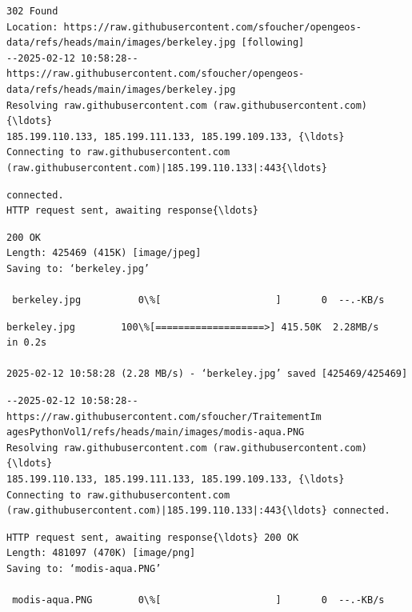 \documentclass[11pt]{article}
\begin{document}
    \begin{Verbatim}[commandchars=\\\{\}]
302 Found
Location: https://raw.githubusercontent.com/sfoucher/opengeos-
data/refs/heads/main/images/berkeley.jpg [following]
--2025-02-12 10:58:28--  https://raw.githubusercontent.com/sfoucher/opengeos-
data/refs/heads/main/images/berkeley.jpg
Resolving raw.githubusercontent.com (raw.githubusercontent.com){\ldots}
185.199.110.133, 185.199.111.133, 185.199.109.133, {\ldots}
Connecting to raw.githubusercontent.com
(raw.githubusercontent.com)|185.199.110.133|:443{\ldots}
    \end{Verbatim}

    \begin{Verbatim}[commandchars=\\\{\}]
connected.
HTTP request sent, awaiting response{\ldots}
    \end{Verbatim}

    \begin{Verbatim}[commandchars=\\\{\}]
200 OK
Length: 425469 (415K) [image/jpeg]
Saving to: ‘berkeley.jpg’

 berkeley.jpg          0\%[                    ]       0  --.-KB/s
    \end{Verbatim}

    \begin{Verbatim}[commandchars=\\\{\}]
 berkeley.jpg        100\%[===================>] 415.50K  2.28MB/s    in 0.2s

2025-02-12 10:58:28 (2.28 MB/s) - ‘berkeley.jpg’ saved [425469/425469]

    \end{Verbatim}

    \begin{Verbatim}[commandchars=\\\{\}]
--2025-02-12 10:58:28--  https://raw.githubusercontent.com/sfoucher/TraitementIm
agesPythonVol1/refs/heads/main/images/modis-aqua.PNG
Resolving raw.githubusercontent.com (raw.githubusercontent.com){\ldots}
185.199.110.133, 185.199.111.133, 185.199.109.133, {\ldots}
Connecting to raw.githubusercontent.com
(raw.githubusercontent.com)|185.199.110.133|:443{\ldots} connected.
    \end{Verbatim}

    \begin{Verbatim}[commandchars=\\\{\}]
HTTP request sent, awaiting response{\ldots} 200 OK
Length: 481097 (470K) [image/png]
Saving to: ‘modis-aqua.PNG’

 modis-aqua.PNG        0\%[                    ]       0  --.-KB/s
    \end{Verbatim}
\end{document}
